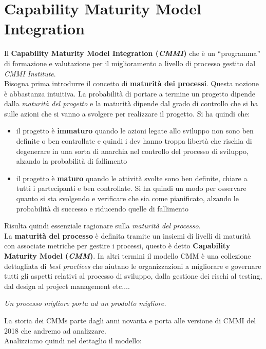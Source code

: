 \documentclass[a4paper,12pt, oneside]{book}
\begin{document}
\chapter{Capability Maturity Model Integration}
Il \textbf{Capability Maturity Model Integration (\textit{CMMI})} che è un
``programma'' di formazione e valutazione per il miglioramento a livello di
processo gestito dal \textit{CMMI Institute}.\\
Bisogna prima introdurre il concetto di \textbf{maturità dei processi}. Questa
nozione è abbastanza intuitiva. La probabilità di portare a termine un progetto
dipende dalla \textit{maturità del progetto} e la maturità dipende dal grado di
controllo che si ha sulle azioni che si vanno a svolgere per realizzare il
progetto. Si ha quindi che:
\begin{itemize}
  \item il progetto è \textbf{immaturo} quando le azioni legate allo sviluppo
  non sono ben definite o ben controllate e quindi i dev hanno troppa libertà
  che rischia di degenerare in una sorta di anarchia nel controllo del processo
  di sviluppo, alzando la probabilità di fallimento
  \item il progetto è \textbf{maturo} quando le attività svolte sono ben
  definite, chiare a tutti i partecipanti e ben controllate. Si ha quindi un
  modo per osservare quanto si sta svolgendo e verificare che sia come
  pianificato, alzando le probabilità di successo e riducendo quelle di
  fallimento
\end{itemize}
Risulta quindi essenziale ragionare sulla \textit{maturità del processo}.\\
La \textbf{maturità del processo} è definita tramite un insiemi di livelli di
maturità con associate metriche per gestire i processi, questo è detto
\textbf{Capability Maturity Model (\textit{CMM})}. In altri termini il modello
CMM è una collezione dettagliata di \textit{best practices} che aiutano le
organizzazioni a migliorare e governare tutti gli aspetti relativi al processo
di sviluppo, dalla gestione dei rischi al testing, dal design al project
management etc$\ldots$. 
\begin{center}
  \textit{Un processo migliore porta ad un prodotto migliore.}
\end{center}
La storia dei CMMs parte dagli anni novanta e porta alle versione di CMMI del
2018 che andremo ad analizzare.\\
Analizziamo quindi nel dettaglio il modello: 
\end{document}
